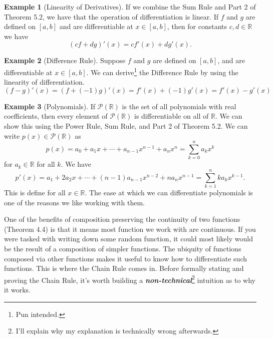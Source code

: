 \documentclass{article}
\newcommand{\R}{\mathbb{R}}
\theoremstyle{definition}
\newtheorem{example}{Example}[section]
\begin{document}
	\begin{example}[Linearity of Derivatives] If we combine the Sum Rule and Part 2 of Theorem 5.2, we have that the operation of differentiation is linear. If $ f $ and $ g $ are defined on $ [a,b] $ and are differentiable at $ x\in[a,b] $, then for constants $ c,d\in\R $ we have
		$$ (cf+dg)'(x)=cf'(x)+dg'(x).$$
	\end{example}
	\begin{example}[Difference Rule]
		Suppose $ f $ and $ g $ are defined on $ [a,b] $, and are differentiable at $ x\in[a,b] $. We can derive\footnote{Pun intended.} the Difference Rule by using the linearity of differentiation.
		$$(f-g)'(x)=(f+(-1)g)'(x)=f'(x)+(-1)g'(x)=f'(x)-g'(x) $$
	\end{example}
	\begin{example}[Polynomials]
		If $ \mathscr{P}(\R) $ is the set of all polynomials with real coefficients, then every element of $ \mathscr{P}(\R) $ is differentiable on all of $ \R $. We can show this using the Power Rule, Sum Rule, and Part 2 of Theorem 5.2. We can write $ p(x)\in\mathscr{P}(\R) $ as $$p(x)=a_0+a_1x+\cdots+a_{n-1}x^{n-1}+a_nx^n=\sum_{k=0}^{n}a_kx^k $$ for $ a_k\in\R $ for all $ k $. We have $$p'(x)=a_1+2a_2x+\cdots+(n-1)a_{n-1}x^{n-2}+na_nx^{n-1}=\sum_{k=1}^{n}ka_kx^{k-1}. $$ This is define for all $ x\in\R $. The ease at which we can differentiate polynomials is one of the reasons we like working with them.
	\end{example}
	One of the benefits of composition preserving the continuity of two functions (Theorem 4.4) is that it means most function we work with are continuous. If you were tasked with writing down some random function, it could most likely would be the result of a composition of simpler functions. The ubiquity of functions composed via other functions makes it useful to know how to differentiate such functions. This is where the Chain Rule comes in. Before formally stating and proving the Chain Rule, it's worth building a \textit{\textbf{non-technical}}\footnote{I'll explain why my explanation is technically wrong afterwards.} intuition as to why it works. 
	
\end{document}
